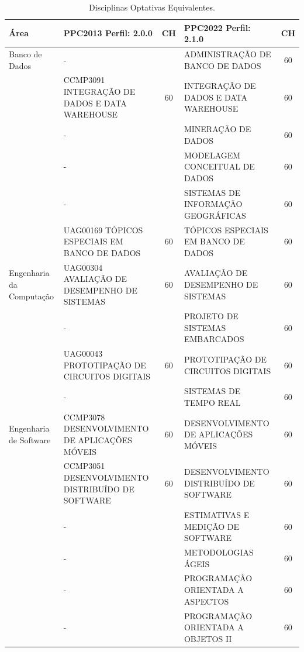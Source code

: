 \documentclass[
	12pt,				%
	openright,			%
  oneside,     %
	a4paper,			%
 hyphens,
	chapter=TITLE,		%
	english,			%
	french,				%
	spanish,			%
	brazil				%
	]{abntex2}
\begin{document}
  \begin{center}
    
    \begin{tiny}
      \begin{longtable}{p{2cm}p{5.4cm}cp{5.4cm}c}
        \caption{\label{quadro:disciplinas-optativas-equivalentes}Disciplinas Optativas Equivalentes.}\\
      \toprule
      \textbf{Área} & \textbf{PPC2013 Perfil: 2.0.0} & \textbf{CH} & \textbf{PPC2022 Perfil: 2.1.0} & \textbf{CH}\\
      \midrule
    Banco de Dados & - & & ADMINISTRAÇÃO DE BANCO DE DADOS & 60 \\ \cline{2-5}
      & CCMP3091 INTEGRAÇÃO DE DADOS E DATA WAREHOUSE & 60 & INTEGRAÇÃO DE DADOS E DATA WAREHOUSE & 60 \\ \cline{2-5}
      & - & & MINERAÇÃO DE DADOS & 60 \\ \cline{2-5}
      & - & & MODELAGEM CONCEITUAL DE DADOS & 60 \\ \cline{2-5}
      & - & & SISTEMAS DE INFORMAÇÃO GEOGRÁFICAS & 60 \\ \cline{2-5}
      & UAG00169 TÓPICOS ESPECIAIS EM BANCO DE DADOS & 60 & TÓPICOS ESPECIAIS EM BANCO DE DADOS & 60 \\ \midrule
    Engenharia da Computação & UAG00304 AVALIAÇÃO DE DESEMPENHO DE SISTEMAS & 60 & AVALIAÇÃO DE DESEMPENHO DE SISTEMAS & 60 \\ \cline{2-5}
      & - & & PROJETO DE SISTEMAS EMBARCADOS & 60 \\ \cline{2-5}
      & UAG00043 PROTOTIPAÇÃO DE CIRCUITOS DIGITAIS & 60 & PROTOTIPAÇÃO DE CIRCUITOS DIGITAIS & 60 \\ \cline{2-5}
      & - & & SISTEMAS DE TEMPO REAL & 60 \\ \midrule
    Engenharia de Software & CCMP3078 DESENVOLVIMENTO DE APLICAÇÕES MÓVEIS & 60 & DESENVOLVIMENTO DE APLICAÇÕES MÓVEIS & 60 \\ \cline{2-5}
    & CCMP3051 DESENVOLVIMENTO DISTRIBUÍDO DE SOFTWARE & 60 & DESENVOLVIMENTO DISTRIBUÍDO DE SOFTWARE & 60 \\ \cline{2-5}
      & - & & ESTIMATIVAS E MEDIÇÃO DE SOFTWARE & 60 \\ \cline{2-5}
      & - & & METODOLOGIAS ÁGEIS & 60 \\ \cline{2-5}
      & - & & PROGRAMAÇÃO ORIENTADA A ASPECTOS & 60 \\ \cline{2-5}
      & - & & PROGRAMAÇÃO ORIENTADA A OBJETOS II & 60 \\ \cline{2-5}

\end{longtable}
\end{tiny}
\end{center}
\end{document}
